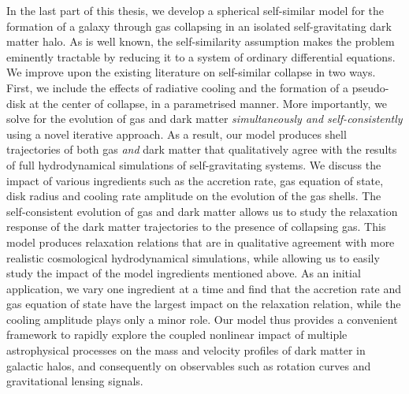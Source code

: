 \documentclass[a4paper, 12pt, oneside]{Thesis}  %
\begin{document}
{In the last part of this thesis, we develop a spherical self-similar model for the formation of a galaxy through gas collapsing in an isolated self-gravitating dark matter halo. As is well known, the self-similarity assumption makes the problem eminently tractable by reducing it to a system of ordinary differential equations. We improve upon the existing literature on self-similar collapse in two ways. First, we include the effects of radiative cooling and the formation of a pseudo-disk at the center of collapse, in a parametrised manner. More importantly, we solve for the evolution of gas and dark matter \emph{simultaneously and self-consistently} using a novel iterative approach. As a result, our model produces shell trajectories of both gas \emph{and} dark matter that qualitatively agree with the results of full hydrodynamical simulations of self-gravitating systems. We discuss the impact of various ingredients such as the accretion rate, gas equation of state, disk radius and cooling rate amplitude on the evolution of the gas shells. The self-consistent evolution of gas and dark matter allows us to study the relaxation response of the dark matter trajectories to the presence of collapsing gas. This model produces relaxation relations that are in qualitative agreement with more realistic cosmological hydrodynamical simulations, while allowing us to easily study the impact of the model ingredients mentioned above. As an initial application, we vary one ingredient at a time and find that the accretion rate and gas equation of state have the largest impact on the relaxation relation, while the cooling amplitude plays only a minor role. Our model thus provides a convenient framework to rapidly explore the coupled nonlinear impact of multiple astrophysical processes on the mass and velocity profiles of dark matter in galactic halos, and consequently on observables such as rotation curves and gravitational lensing signals.



}

\clearpage  %

\end{document}
